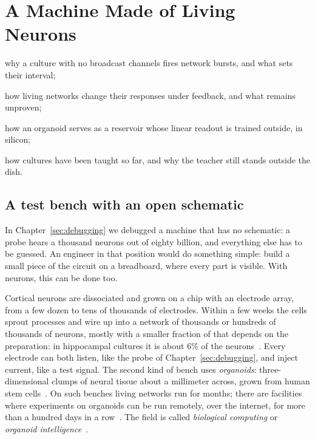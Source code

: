 \chapter{A Machine Made of Living Neurons}
\label{sec:livingmachine}
\begin{chaptergoals}
\item why a culture with no broadcast channels fires network bursts, and what sets their interval;
\item how living networks change their responses under feedback, and what remains unproven;
\item how an organoid serves as a reservoir whose linear readout is trained outside, in silicon;
\item how cultures have been taught so far, and why the teacher still stands outside the dish.
\end{chaptergoals}

\section{A test bench with an open schematic}

In Chapter~\ref{sec:debugging} we debugged a machine that has no schematic: a probe hears a thousand neurons out of eighty billion, and everything else has to be guessed. An engineer in that position would do something simple: build a small piece of the circuit on a breadboard, where every part is visible. With neurons, this can be done too.

Cortical neurons are dissociated and grown on a chip with an electrode array, from a few dozen to tens of thousands of electrodes. Within a few weeks the cells sprout processes and wire up into a network of thousands or hundreds of thousands of neurons, mostly  with a smaller fraction of  that depends on the preparation: in hippocampal cultures it is about $6\%$ of the neurons~\cite{Benson1994}. Every electrode can both listen, like the probe of Chapter~\ref{sec:debugging}, and inject current, like a test signal. The second kind of bench uses \emph{organoids}: three-dimensional clumps of neural tissue about a millimeter across, grown from human stem cells~\cite{Lancaster2013}. On such benches living networks run for months; there are facilities where experiments on organoids can be run remotely, over the internet, for more than a hundred days in a row~\cite{Jordan2024}. The field is called \emph{biological computing} or \emph{organoid intelligence}~\cite{Smirnova2023}.

